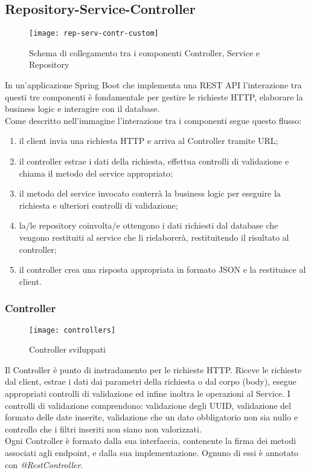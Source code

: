 \subsection{Repository-Service-Controller}

\begin{figure}[H] 
    \centering 
    \texttt{[image: rep-serv-contr-custom]} 
    \caption{Schema di collegamento tra i componenti Controller, Service e Repository}
\end{figure}

\noindent In un'applicazione Spring Boot che implementa una REST API l'interazione tra questi tre componenti è fondamentale per gestire le richieste HTTP, elaborare la business logic e interagire con il database.\\
Come descritto nell'immagine l'interazione tra i componenti segue questo flusso:
\begin{enumerate}
\item il client invia una richiesta HTTP e arriva al Controller tramite URL;
\item il controller estrae i dati della richiesta, effettua controlli di validazione e chiama il metodo del service appropriato;
\item il metodo del service invocato conterrà la business logic per eseguire la richiesta e ulteriori controlli di validazione;
\item la/le repository coinvolta/e ottengono i dati richiesti dal database che vengono restituiti al service che li rielaborerà, restituitendo il risultato al controller;
\item il controller crea una risposta appropriata in formato JSON e la restituisce al client.
\end{enumerate}

\subsubsection{Controller}
\begin{figure}[H] 
    \centering 
    \texttt{[image: controllers]} 
    \caption{Controller sviluppati}
\end{figure}
Il Controller è punto di instradamento per le richieste HTTP. Riceve le richieste dal client, estrae i dati dai parametri della richiesta o dal corpo (body), esegue appropriati controlli di validazione ed infine inoltra le operazioni al Service. I controlli di validazione comprendono: validazione degli UUID, validazione del formato delle date inserite, validazione che un dato obbligatorio non sia nullo e controllo che i filtri inseriti non siano non valorizzati.\\
Ogni Controller è formato dalla sua interfaccia, contenente la firma dei metodi associati agli endpoint, e dalla sua implementazione. Ognuno di essi è annotato con \textit{@RestController}.


